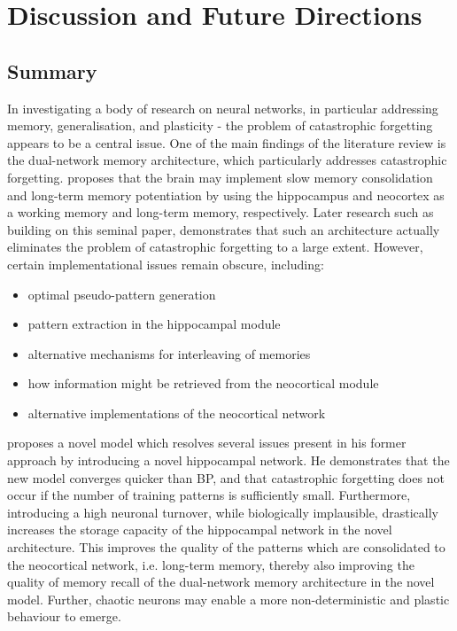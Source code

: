 
\chapter{Discussion and Future Directions}\label{chpt:discussion_future_work}
\section{Summary}


In investigating a body of research on neural networks, in particular addressing memory, generalisation, and plasticity - the problem of catastrophic forgetting appears to be a central issue. One of the main findings of the literature review is the dual-network memory architecture, which particularly addresses catastrophic forgetting. \cite{McClelland1995} proposes that the brain may implement slow memory consolidation and long-term memory potentiation by using the hippocampus and neocortex as a working memory and long-term memory, respectively. Later research such as \citep{French1997, Ans1997, Ans2000, French2001, Hattori2010, Hattori2014} building on this seminal paper, demonstrates that such an architecture actually eliminates the problem of catastrophic forgetting to a large extent. However, certain implementational issues remain obscure, including:
\begin{itemize}
\item optimal pseudo-pattern generation
\item pattern extraction in the hippocampal module
\item alternative mechanisms for interleaving of memories
\item how information might be retrieved from the neocortical module
\item alternative implementations of the neocortical network
\end{itemize}

\cite{Hattori2014} proposes a novel model which resolves several issues present in his former approach by introducing a novel hippocampal network. He demonstrates that the new model converges quicker than BP, and that catastrophic forgetting does not occur if the number of training patterns is sufficiently small. Furthermore, introducing a high neuronal turnover, while biologically implausible, drastically increases the storage capacity of the hippocampal network in the novel architecture. This improves the quality of the patterns which are consolidated to the neocortical network, i.e. long-term memory, thereby also improving the quality of memory recall of the dual-network memory architecture in the novel model. Further, chaotic neurons may enable a more non-deterministic and plastic behaviour to emerge.

